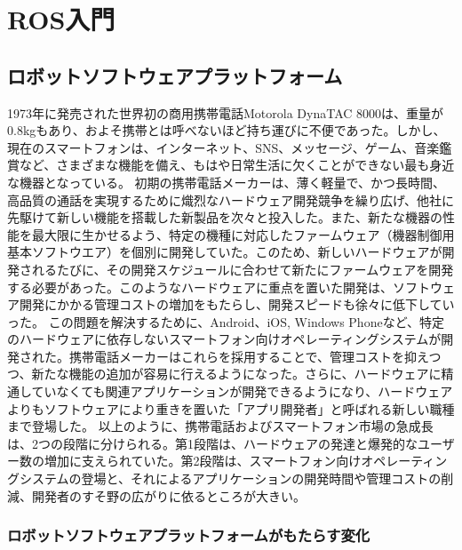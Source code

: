 
\chapter{ROS入門}

\section{ロボットソフトウェアプラットフォーム}

1973年に発売された世界初の商用携帯電話Motorola DynaTAC  8000は、重量が0.8kgもあり、およそ携帯とは呼べないほど持ち運びに不便であった。しかし、現在のスマートフォンは、インターネット、SNS、メッセージ、ゲーム、音楽鑑賞など、さまざまな機能を備え、もはや日常生活に欠くことができない最も身近な機器となっている。
初期の携帯電話メーカーは、薄く軽量で、かつ長時間、高品質の通話を実現するために熾烈なハードウェア開発競争を繰り広げ、他社に先駆けて新しい機能を搭載した新製品を次々と投入した。また、新たな機器の性能を最大限に生かせるよう、特定の機種に対応したファームウェア（機器制御用基本ソフトウエア）を個別に開発していた。このため、新しいハードウェアが開発されるたびに、その開発スケジュールに合わせて新たにファームウェアを開発する必要があった。このようなハードウェアに重点を置いた開発は、ソフトウェア開発にかかる管理コストの増加をもたらし、開発スピードも徐々に低下していった。
この問題を解決するために、Android、iOS, Windows Phoneなど、特定のハードウェアに依存しないスマートフォン向けオペレーティングシステムが開発された。携帯電話メーカーはこれらを採用することで、管理コストを抑えつつ、新たな機能の追加が容易に行えるようになった。さらに、ハードウェアに精通していなくても関連アプリケーションが開発できるようになり、ハードウェアよりもソフトウェアにより重きを置いた「アプリ開発者」と呼ばれる新しい職種まで登場した。
以上のように、携帯電話およびスマートフォン市場の急成長は、2つの段階に分けられる。第1段階は、ハードウェアの発達と爆発的なユーザー数の増加に支えられていた。第2段階は、スマートフォン向けオペレーティングシステムの登場と、それによるアプリケーションの開発時間や管理コストの削減、開発者のすそ野の広がりに依るところが大きい。

\subsection{ロボットソフトウェアプラットフォームがもたらす変化}

